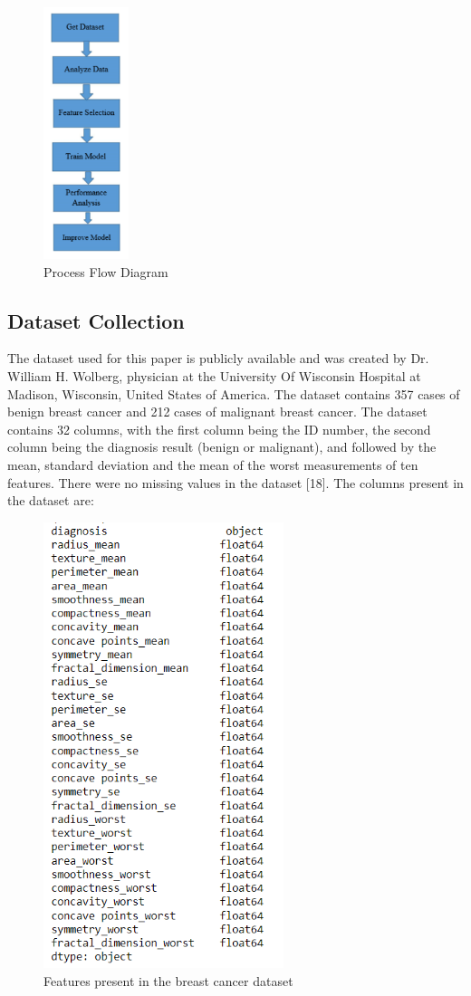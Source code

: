 \documentclass[conference]{IEEEtran}
\begin{document}
\begin{figure}[htbp]
\centerline{\includegraphics[width=25mm]{proposed.png}}
\caption{Process Flow Diagram}
\label{fig}
\end{figure}

\subsection{Dataset Collection}\label{AA}
The dataset used for this paper is publicly available and was created by Dr. William H. Wolberg, physician at the University Of Wisconsin Hospital at Madison, Wisconsin, United States of America. 
The dataset contains 357 cases of benign breast cancer and 212 cases of malignant breast cancer. The dataset contains 32 columns, with the first column being the ID number, the second column being the diagnosis result (benign or malignant), and followed by the mean, standard deviation and the mean of the
worst measurements of ten features. There were no missing values in the dataset [18].
The columns present in the dataset are:
\begin{figure}[htbp]
\centerline{\includegraphics[width=70mm]{dataset.png}}
\caption{Features present in the breast cancer dataset}
\label{fig}
\end{figure} 
\end{document}
